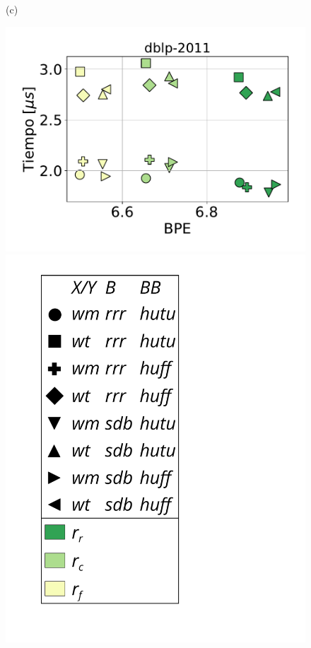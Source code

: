 \begin{figure}
\begin{minipage}{1\textwidth}
\begin{minipage}{0.45\textwidth}
    			(c)
    		\end{minipage}
    		\begin{minipage}{0.45\textwidth}
    			\centering
    			\begin{minipage}{0.85\textwidth}
    				\centering
    				\includegraphics[width=1\linewidth]{img/sdsl/secuencial/dblp-2011.pdf}
    			\end{minipage}
    			\begin{minipage}{0.1\textwidth}
    				\centering
    				\includegraphics[scale=.16, clip, trim=70 0 0 0]{img/sdsl/label.pdf}
    			\end{minipage}
    			

\end{minipage}
\end{minipage}
\end{figure}

